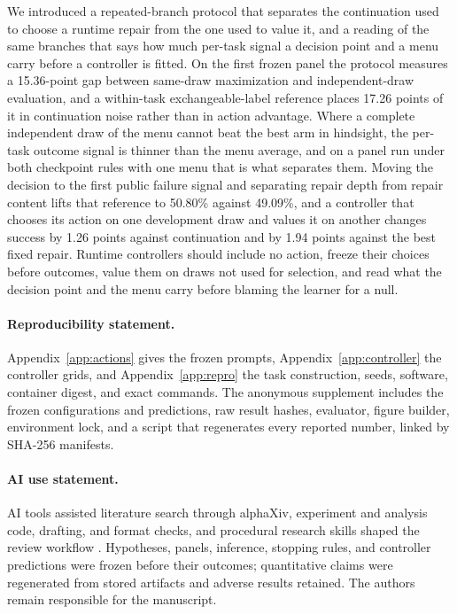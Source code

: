 We introduced a repeated-branch protocol that separates the continuation used to choose a runtime repair from the one used to value it, and a reading of the same branches that says how much per-task signal a decision point and a menu carry before a controller is fitted. On the first frozen panel the protocol measures a 15.36-point gap between same-draw maximization and independent-draw evaluation, and a within-task exchangeable-label reference places 17.26 points of it in continuation noise rather than in action advantage. Where a complete independent draw of the menu cannot beat the best arm in hindsight, the per-task outcome signal is thinner than the menu average, and on a panel run under both checkpoint rules with one menu that is what separates them. Moving the decision to the first public failure signal and separating repair depth from repair content lifts that reference to 50.80\% against 49.09\%, and a controller that chooses its action on one development draw and values it on another changes success by 1.26 points against continuation and by 1.94 points against the best fixed repair. Runtime controllers should include no action, freeze their choices before outcomes, value them on draws not used for selection, and read what the decision point and the menu carry before blaming the learner for a null.


\paragraph{Reproducibility statement.}
Appendix~\ref{app:actions} gives the frozen prompts, Appendix~\ref{app:controller} the controller grids, and Appendix~\ref{app:repro} the task construction, seeds, software, container digest, and exact commands. The anonymous supplement includes the frozen configurations and predictions, raw result hashes, evaluator, figure builder, environment lock, and a script that regenerates every reported number, linked by SHA-256 manifests.

\paragraph{AI use statement.}
AI tools assisted literature search through alphaXiv, experiment and analysis code, drafting, and format checks, and procedural research skills shaped the review workflow \citep{kassis2026skills}. Hypotheses, panels, inference, stopping rules, and controller predictions were frozen before their outcomes; quantitative claims were regenerated from stored artifacts and adverse results retained. The authors remain responsible for the manuscript.
\label{main-end}

